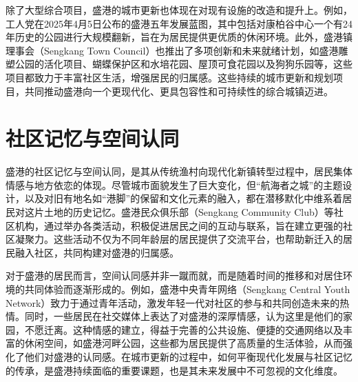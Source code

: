 \documentclass[11pt,a4paper,twoside,openany]{book}
\begin{document}
除了大型综合项目，盛港的城市更新也体现在对现有设施的改造和提升上。例如，工人党在2025年4月5日公布的盛港五年发展蓝图，其中包括对康柏谷中心一个有24年历史的公园进行大规模翻新，旨在为居民提供更优质的休闲环境。此外，盛港镇理事会（Sengkang Town Council）也推出了多项创新和未来就绪计划，如盛港雕塑公园的活化项目、蝴蝶保护区和水培花园、屋顶可食花园以及狗狗乐园等，这些项目都致力于丰富社区生活，增强居民的归属感。这些持续的城市更新和规划项目，共同推动盛港向一个更现代化、更具包容性和可持续性的综合城镇迈进。

\section{社区记忆与空间认同}
盛港的社区记忆与空间认同，是其从传统渔村向现代化新镇转型过程中，居民集体情感与地方依恋的体现。尽管城市面貌发生了巨大变化，但“航海者之城”的主题设计，以及对旧有地名如“港脚”的保留和文化元素的融入，都在潜移默化中维系着居民对这片土地的历史记忆。盛港民众俱乐部（Sengkang Community Club）等社区机构，通过举办各类活动，积极促进居民之间的互动与联系，旨在建立更强的社区凝聚力。这些活动不仅为不同年龄层的居民提供了交流平台，也帮助新迁入的居民融入社区，共同构建对盛港的归属感。

对于盛港的居民而言，空间认同感并非一蹴而就，而是随着时间的推移和对居住环境的共同体验而逐渐形成的。例如，盛港中央青年网络（Sengkang Central Youth Network）致力于通过青年活动，激发年轻一代对社区的参与和共同创造未来的热情。同时，一些居民在社交媒体上表达了对盛港的深厚情感，认为这里是他们的家园，不愿迁离。这种情感的建立，得益于完善的公共设施、便捷的交通网络以及丰富的休闲空间，如盛港河畔公园，这些都为居民提供了高质量的生活体验，从而强化了他们对盛港的认同感。在城市更新的过程中，如何平衡现代化发展与社区记忆的传承，是盛港持续面临的重要课题，也是其未来发展中不可忽视的文化维度。
\end{document}
